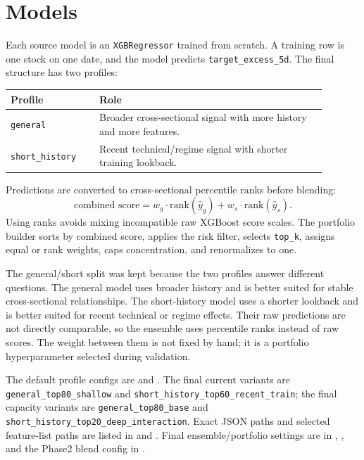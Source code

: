 \documentclass[11pt]{article}
\begin{document}
\clearpage

\section{Models}

Each source model is an \texttt{XGBRegressor} trained from scratch. A training
row is one stock on one date, and the model predicts \texttt{target\_excess\_5d}.
The final structure has two profiles:

\begin{table}[h]
\centering
\begin{tabular}{p{0.25\linewidth}p{0.64\linewidth}}
\toprule
Profile & Role \\
\midrule
\texttt{general} & Broader cross-sectional signal with more history and more features. \\
\texttt{short\_history} & Recent technical/regime signal with shorter training lookback. \\
\bottomrule
\end{tabular}
\end{table}

Predictions are converted to cross-sectional percentile ranks before blending:
\[
\text{combined score}
= w_g \cdot \text{rank}(\hat y_g)
+ w_s \cdot \text{rank}(\hat y_s).
\]
Using ranks avoids mixing incompatible raw XGBoost score scales. The portfolio
builder sorts by combined score, applies the risk filter, selects \texttt{top\_k},
assigns equal or rank weights, caps concentration, and renormalizes to one.

The general/short split was kept because the two profiles answer different
questions. The general model uses broader history and is better suited for
stable cross-sectional relationships. The short-history model uses a shorter
lookback and is better suited for recent technical or regime effects. Their raw
predictions are not directly comparable, so the ensemble uses percentile ranks
instead of raw scores. The weight between them is not fixed by hand; it is a
portfolio hyperparameter selected during validation.

The default profile configs are  and
. The final current variants are
\texttt{general\_top80\_shallow} and
\texttt{short\_history\_top60\_recent\_train}; the final capacity variants are
\texttt{general\_top80\_base} and
\texttt{short\_history\_top20\_deep\_interaction}. Exact JSON paths and selected
feature-list paths are listed in  and
. Final ensemble/portfolio settings are in
, ,
and the Phase2 blend config in .
\end{document}
